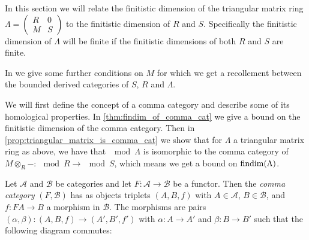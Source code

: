 In this section we will relate the finitistic dimension of the triangular matrix ring $\Lambda = \begin{pmatrix}
R & 0\\
M& S
\end{pmatrix}$ to the finitistic dimension of $R$ and $S$. Specifically the finitistic dimension of $\Lambda$ will be finite if the finitistic dimensions of both $R$ and $S$ are finite. 

In  we give some further conditions on $M$ for which we get a recollement between the bounded derived categories of $S$, $R$ and $\Lambda$.

We will first define the concept of a comma category and describe some of its homological properties. In \cref{thm:findim_of_comma_cat} we give a bound on the finitistic dimension of the comma category. Then in \cref{prop:triangular_matrix_is_comma_cat} we show that for $\Lambda$ a triangular matrix ring as above, we have that $\mod \Lambda$ is isomorphic to the comma category of $M\otimes_R - \colon \mod R \to \mod S$, which means we get a bound on $\operatorname{findim}(\Lambda)$.

\begin{defn}
	Let $\mathcal A$ and $\mathcal B$ be categories and let $F\colon\mathcal A \to \mathcal B$ be a functor. Then the \emph{comma category} $(F, \mathcal  B)$ has as objects triplets $(A, B, f)$ with $A \in \mathcal  A$, $B \in \mathcal  B$, and $f\colon FA \to B$ a morphism in $\mathcal  B$. The morphisms are pairs $(\alpha, \beta)\colon(A, B, f) \to (A', B', f')$ with $\alpha\colon A \to A'$ and $\beta\colon B \to B'$ such that the following diagram commutes:
	\begin{center}
	\end{center}
\end{defn}

